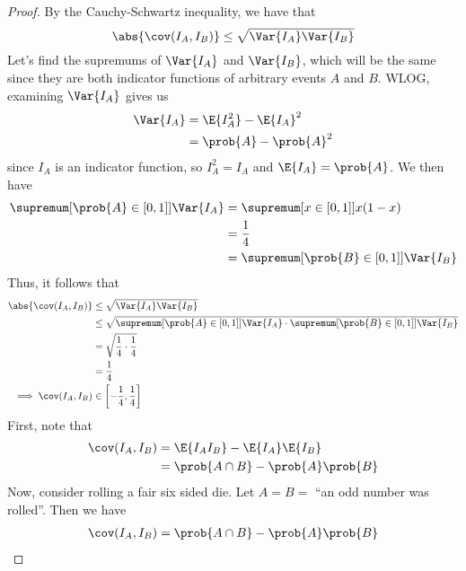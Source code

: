 \documentclass[%
  hwnumber=6,%
  studentnumber=20053722,%
  {name=Bryan Hoang}%
]{%
  mthe353answer%
}
\begin{document}
  \begin{questions}
    \setcounter{question}{3}
    \question{}
    \begin{solution}
      \begin{proof}
        By the Cauchy-Schwartz inequality, we have that
        \begin{equation*}
          \abs{\cov(I_A,I_B)} \le \sqrt{\Var{I_A}\Var{I_B}}
        \end{equation*}
        Let's find the supremums of \(\Var{I_A}\) and \(\Var{I_B}\), which will
        be the same since they are both indicator functions of arbitrary events
        \(A\) and \(B\). WLOG, examining \(\Var{I_A}\) gives us
        \begin{align*}
          \Var{I_A} &= \E{I_A^2} - \E{I_A}^2\\
          &= \prob{A} - \prob{A}^2
        \end{align*}
        since \(I_A\) is an indicator function, so \(I_A^2 = I_A\) and
        \(\E{I_A} = \prob{A}\). We then have
        \begin{align*}
          \supremum[\prob{A}\in{[0,1]}]{\Var{I_A}} &= \supremum[x\in{[0,1]}]{x(1-x)}\\
          &= \frac{1}{4}\\
          &= \supremum[\prob{B}\in{[0,1]}]{\Var{I_B}}
        \end{align*}
        Thus, it follows that
        \begin{align*}
          \abs{\cov(I_A,I_B)} &\le \sqrt{\Var{I_A}\Var{I_B}}\\
          &\le \sqrt{\supremum[\prob{A}\in{[0,1]}]{\Var{I_A} }\cdot \supremum[\prob{B}\in{[0,1]}]{\Var{I_B}}}\\
          &= \sqrt{\frac{1}{4} \cdot \frac{1}{4}}\\
          &= \frac{1}{4}\\
          \implies \cov(I_A, I_B) &\in \left[-\frac{1}{4},\frac{1}{4}\right] \qedhere
        \end{align*}
        First, note that
        \begin{align*}
          \cov(I_A,I_B) &= \E{I_A I_B} - \E{I_A}\E{I_B}\\
          &= \prob{A \cap B} - \prob{A}\prob{B}
        \end{align*}
        Now, consider rolling a fair six sided die. Let \(A = B =\) ``an odd number was rolled''.
        Then we have
        \begin{align*}
          \cov(I_A,I_B) &= \prob{A \cap B} - \prob{A}\prob{B}\\

\end{align*}
\end{proof}
\end{solution}
\end{questions}
\end{document}
